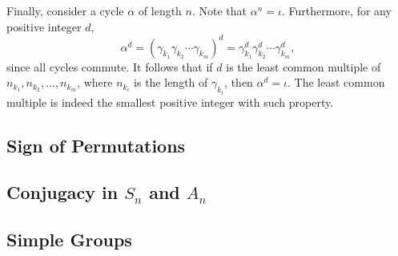 \documentclass[main.tex]{subfiles}
\begin{document}
				Finally, consider a cycle $\alpha$ of length $n$. Note that $\alpha^n = \iota$. Furthermore, for any positive integer $d$,
				\begin{equation*}
				\alpha^d = (\gamma_{k_1}\gamma_{k_2}\cdots\gamma_{k_m})^d = \gamma_{k_1}^d\gamma_{k_2}^d\cdots\gamma_{k_m}^d,
				\end{equation*}
				since all cycles commute. It follows that if $d$ is the least common multiple of $n_{k_1}, n_{k_2}, \ldots, n_{k_m}$, where $n_{k_i}$ is the length of $\gamma_{k_i}$, then $\alpha^d = \iota$. The least common multiple is indeed the smallest positive integer with such property.
			\subsection{Sign of Permutations}
			
			\subsection{Conjugacy in $S_n$ and $A_n$}
			
			\subsection{Simple Groups}
			
\end{document}
